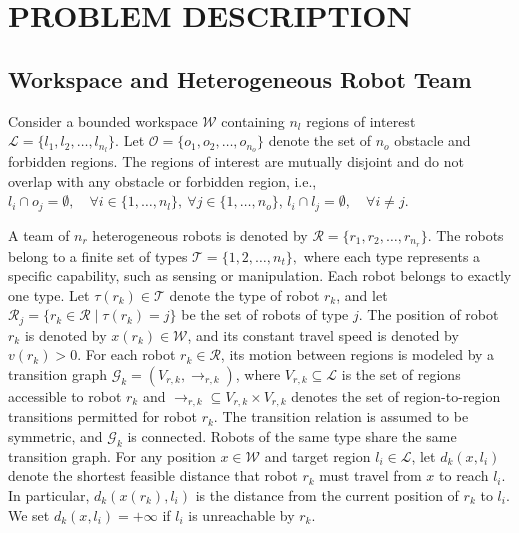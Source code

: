 \documentclass[lettersize,journal]{IEEEtran}
\theoremstyle{italiclemma}
\theoremstyle{italiclemma}
\theoremstyle{definition}
\begin{document}
\section{PROBLEM DESCRIPTION}
\label{sec:problem_description}

\subsection{Workspace and Heterogeneous Robot Team}

Consider a  bounded workspace $\mathcal{W}$ containing $n_l$ regions of interest $\mathcal{L}=\{l_1,l_2,\ldots,l_{n_l}\}$. Let $\mathcal{O}= \{o_1,o_2,\ldots,o_{n_o}\}$ denote the set of $n_o$ obstacle and forbidden regions.
The regions of interest are mutually disjoint and do not overlap with any obstacle or forbidden region, i.e., $l_i\cap o_j=\emptyset,\quad \forall i\in\{1,\ldots,n_l\},\ \forall j\in\{1,\ldots,n_o\}$, $l_i\cap l_j=\emptyset,\quad \forall i\neq j $. 

A team of $n_r$ heterogeneous robots is denoted by $ \mathcal{R}=\{r_1,r_2,\ldots,r_{n_r}\}.$
The robots belong to a finite set of types $\mathcal{T}=\{1,2,\ldots,n_t\},$ where each type represents a specific capability, such as sensing or manipulation. Each robot belongs to exactly one type. Let $\tau(r_k)\in\mathcal{T}$ denote the type of robot $r_k$, and let $\mathcal{R}_j=\{r_k\in\mathcal{R}\mid \tau(r_k)=j\}$ be the set of robots of type $j$. The position of robot $r_k$ is denoted by $x(r_k)\in\mathcal W$, and its constant travel speed is denoted by $v(r_k)>0$. For each robot $r_k \in \mathcal{R}$, its motion between regions is modeled by a transition graph $\mathcal G_{k}=(V_{r,k},\xrightarrow{}_{r,k})$, where $V_{r,k}\subseteq\mathcal L$ is the set of regions accessible to robot $r_k$ and $\xrightarrow{}_{r,k} \subseteq V_{r,k}\times V_{r,k}$ denotes the set of region-to-region transitions permitted for robot $r_k$. The transition relation is assumed to be symmetric, and $\mathcal G_k$ is connected. Robots of the same type share the same transition graph.
For any position $x\in\mathcal W$ and target region $l_i\in\mathcal L$, let $d_k(x,l_i)$ denote the shortest feasible distance that robot $r_k$ must travel from $x$ to reach $l_i$. In particular, $d_k(x(r_k),l_i)$ is the distance from the current position of $r_k$ to $l_i$. We set $d_k(x,l_i)=+\infty$ if $l_i$ is unreachable by $r_k$.
\end{document}
